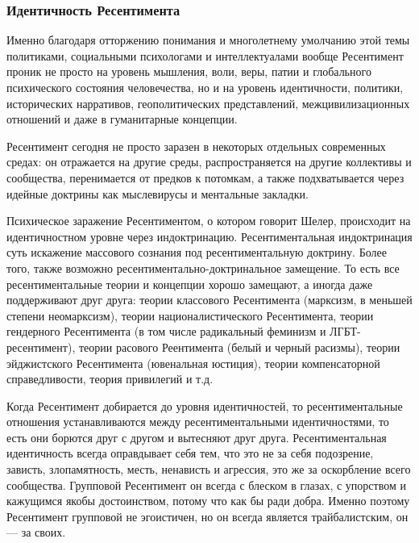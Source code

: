  
 
 
 
 

\subsubsection{Идентичность Ресентимента}
\label{sec:11_02_2022.stz.news.ua.hvylya.1.vse_zlo_ot_ressentimenta.4.identichnost_ressentimenta}

Именно благодаря отторжению понимания и многолетнему умолчанию этой темы
политиками, социальными психологами и интеллектуалами вообще Ресентимент проник
не просто на уровень мышления, воли, веры, патии и глобального психического
состояния человечества, но и на уровень идентичности, политики, исторических
нарративов, геополитических представлений, межцивилизационных отношений и даже
в гуманитарные концепции.

Ресентимент сегодня не просто заразен в некоторых отдельных современных средах:
он отражается на другие среды, распространяется на другие коллективы и
сообщества, перенимается от предков к потомкам, а также подхватывается через
идейные доктрины как мыслевирусы и ментальные закладки.

Психическое заражение Ресентиментом, о котором говорит Шелер, происходит на
идентичностном уровне через индоктринацию. Ресентиментальная индоктринация суть
искажение массового сознания под ресентиментальную доктрину. Более того, также
возможно ресентиментально-доктринальное замещение. То есть все
ресентиментальные теории и концепции хорошо замещают, а иногда даже
поддерживают друг друга: теории классового Ресентимента (марксизм, в меньшей
степени неомарксизм), теории националистического Ресентимента, теории
гендерного Ресентимента (в том числе радикальный феминизм и ЛГБТ-ресентимент),
теории расового Реентимента (белый и черный расизмы), теории эйджистского
Ресентимента (ювенальная юстиция), теории компенсаторной справедливости, теория
привилегий и т.д.

Когда Ресентимент добирается до уровня идентичностей, то ресентиментальные
отношения устанавливаются между ресентиментальными идентичностями, то есть они
борются друг с другом и вытесняют друг друга. Ресентиментальная идентичность
всегда оправдывает себя тем, что это не за себя подозрение, зависть,
злопамятность, месть, ненависть и агрессия, это же за оскорбление всего
сообщества. Групповой Ресентимент он всегда с блеском в глазах, с упорством и
кажущимся якобы достоинством, потому что как бы ради добра. Именно поэтому
Ресентимент групповой не эгоистичен, но он всегда является трайбалистским, он —
за своих.

